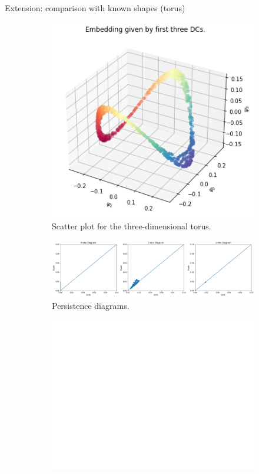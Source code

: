 \documentclass[xcolor={dvipsnames,svgnames}]{beamer}
\begin{document}
\begin{frame}{Extension: comparison with known shapes (torus)}
\begin{figure}[H]
\centering
\begin{subfigure}[b]{0.2\textwidth}
    \includegraphics[width=\textwidth]{figures/torus.png}
    \caption{Scatter plot for the three-dimensional torus.}
\end{subfigure}
\hfill
\begin{subfigure}[b]{0.75\textwidth}
    \includegraphics[width=\textwidth]{figures/torus_Hk.png}
    \caption{Persistence diagrams.}
\end{subfigure}
\begin{subfigure}[b]{0.25\textwidth}
\includegraphics[width=\textwidth]{figures/white.png} 

\end{subfigure}
\end{figure}
\end{frame}
\end{document}
